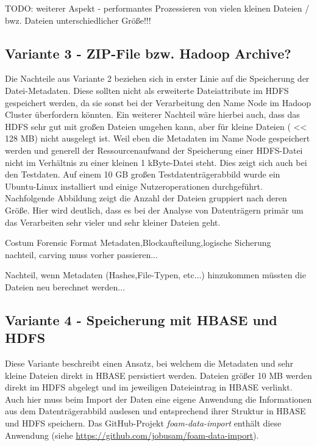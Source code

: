 \noindent
TODO: weiterer Aspekt - performantes Prozessieren von vielen kleinen Dateien / bwz. Dateien unterschiedlicher Größe!!!\\

\subsection{Variante 3 - ZIP-File bzw. Hadoop Archive?}
Die Nachteile aus Variante 2 beziehen sich in erster Linie auf die Speicherung der Datei-Metadaten. Diese sollten nicht als erweiterte Dateiattribute im HDFS gespeichert werden, da sie sonst bei der Verarbeitung den Name Node im Hadoop Cluster überfordern könnten. Ein weiterer Nachteil wäre hierbei auch, dass das HDFS sehr gut mit großen Dateien umgehen kann, aber für kleine Dateien ( << 128 MB) nicht ausgelegt ist. Weil eben die Metadaten im Name Node gespeichert werden und generell der Ressourcenaufwand der Speicherung einer HDFS-Datei nicht im Verhältnis zu einer kleinen 1 kByte-Datei steht. Dies zeigt sich auch bei den Testdaten. Auf einem 10 GB großen Testdatenträgerabbild wurde ein Ubuntu-Linux installiert und einige Nutzeroperationen durchgeführt. Nachfolgende Abbildung zeigt die Anzahl der Dateien gruppiert nach deren Größe. Hier wird deutlich, dass es bei der Analyse von Datenträgern primär um das Verarbeiten sehr vieler und sehr kleiner Dateien geht. 

Costum Forensic Format
Metadaten,Blockaufteilung,logische Sicherung\\
nachteil, carving muss vorher passieren...

Nachteil, wenn Metadaten (Hashes,File-Typen, etc...) hinzukommen müssten die Dateien neu berechnet werden...

\subsection{Variante 4 - Speicherung mit HBASE und HDFS}
Diese Variante beschreibt einen Ansatz, bei welchem die Metadaten und sehr kleine Dateien direkt in HBASE persistiert werden. Dateien größer 10 MB werden direkt im HDFS abgelegt und im jeweiligen Dateieintrag in HBASE verlinkt. Auch hier muss beim Import der Daten eine eigene Anwendung die Informationen aus dem Datenträgerabbild auslesen und entsprechend ihrer Struktur in HBASE und HDFS speichern. Das GitHub-Projekt \textit{foam-data-import} enthält diese Anwendung (siehe \url{https://github.com/jobusam/foam-data-import}).\\


